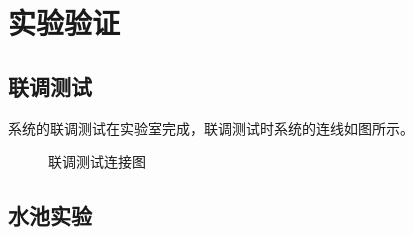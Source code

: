 \chapter{实验验证}
\section{联调测试}
系统的联调测试在实验室完成，联调测试时系统的连线如图所示。
\begin{figure}[htbp]
	\centering
	
	\caption{联调测试连接图}
	\label{fig:exp:liantiao}
\end{figure}
\section{水池实验}